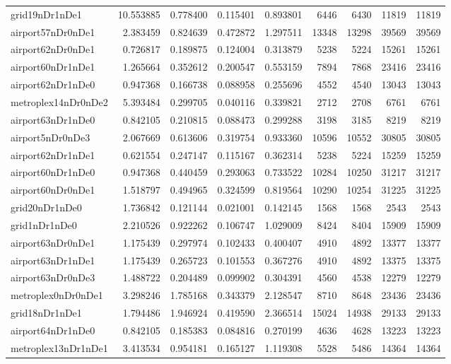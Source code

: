 \begin{longtable}{|l|r|r|r|r|r|r|r|r|}
grid19nDr1nDe1 & 10.553885 & 0.778400 & 0.115401 & 0.893801 & 6446 & 6430 & 11819 & 11819 \\
airport57nDr0nDe1 & 2.383459 & 0.824639 & 0.472872 & 1.297511 & 13348 & 13298 & 39569 & 39569 \\
airport62nDr0nDe1 & 0.726817 & 0.189875 & 0.124004 & 0.313879 & 5238 & 5224 & 15261 & 15261 \\
airport60nDr1nDe1 & 1.265664 & 0.352612 & 0.200547 & 0.553159 & 7894 & 7868 & 23416 & 23416 \\
airport62nDr1nDe0 & 0.947368 & 0.166738 & 0.088958 & 0.255696 & 4552 & 4540 & 13043 & 13043 \\
metroplex14nDr0nDe2 & 5.393484 & 0.299705 & 0.040116 & 0.339821 & 2712 & 2708 & 6761 & 6761 \\
airport63nDr1nDe0 & 0.842105 & 0.210815 & 0.088473 & 0.299288 & 3198 & 3185 & 8219 & 8219 \\
airport5nDr0nDe3 & 2.067669 & 0.613606 & 0.319754 & 0.933360 & 10596 & 10552 & 30805 & 30805 \\
airport62nDr1nDe1 & 0.621554 & 0.247147 & 0.115167 & 0.362314 & 5238 & 5224 & 15259 & 15259 \\
airport60nDr1nDe0 & 0.947368 & 0.440459 & 0.293063 & 0.733522 & 10284 & 10250 & 31217 & 31217 \\
airport60nDr0nDe1 & 1.518797 & 0.494965 & 0.324599 & 0.819564 & 10290 & 10254 & 31225 & 31225 \\
grid20nDr1nDe0 & 1.736842 & 0.121144 & 0.021001 & 0.142145 & 1568 & 1568 & 2543 & 2543 \\
grid1nDr1nDe0 & 2.210526 & 0.922262 & 0.106747 & 1.029009 & 8424 & 8404 & 15909 & 15909 \\
airport63nDr0nDe1 & 1.175439 & 0.297974 & 0.102433 & 0.400407 & 4910 & 4892 & 13377 & 13377 \\
airport63nDr1nDe1 & 1.175439 & 0.265723 & 0.101553 & 0.367276 & 4910 & 4892 & 13375 & 13375 \\
airport63nDr0nDe3 & 1.488722 & 0.204489 & 0.099902 & 0.304391 & 4560 & 4538 & 12279 & 12279 \\
metroplex0nDr0nDe1 & 3.298246 & 1.785168 & 0.343379 & 2.128547 & 8710 & 8648 & 23436 & 23436 \\
grid18nDr1nDe1 & 1.794486 & 1.946924 & 0.419590 & 2.366514 & 15024 & 14938 & 29133 & 29133 \\
airport64nDr1nDe0 & 0.842105 & 0.185383 & 0.084816 & 0.270199 & 4636 & 4628 & 13223 & 13223 \\
metroplex13nDr1nDe1 & 3.413534 & 0.954181 & 0.165127 & 1.119308 & 5528 & 5486 & 14364 & 14364 \\

\end{longtable}
